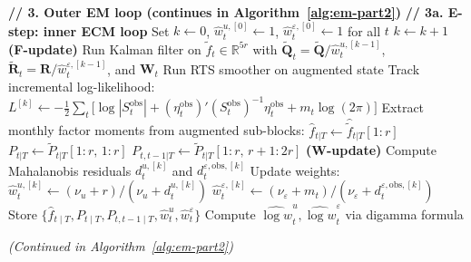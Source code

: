 \documentclass[11pt, a4paper, oneside]{article}
\begin{document}
\begin{algorithm}[H]
\begin{algorithmic}[1]
\vspace{0.3em}
\State \textbf{// 3. Outer EM loop (continues in Algorithm~\ref{alg:em-part2})}
    \vspace{0.2em}
    \State \textbf{// 3a. E-step: inner ECM loop}
    \State Set $k \gets 0$, $\hat{w}^{u,[0]}_t \gets 1$, $\hat{w}^{\varepsilon,[0]}_t \gets 1$ for all $t$
    \Repeat
        \State $k \gets k + 1$
        \State \textbf{(F-update)} Run Kalman filter on $\tilde{f}_t \in \mathbb{R}^{5r}$ with
        \Statex \quad $\tilde{\mathbf{Q}}_t = \tilde{\mathbf{Q}}/\hat{w}^{u,[k-1]}_t$, $\tilde{\mathbf{R}}_t = \mathbf{R}/\hat{w}^{\varepsilon,[k-1]}_t$, and $\mathbf{W}_t$
        \State Run RTS smoother on augmented state
        \State Track incremental log-likelihood:
        \Statex \quad $L^{[k]} \gets -\tfrac{1}{2}\sum_t \big[\log|S^{\mathrm{obs}}_t| + (\eta^{\mathrm{obs}}_t)' (S^{\mathrm{obs}}_t)^{-1} \eta^{\mathrm{obs}}_t + m_t \log(2\pi)\big]$
        \State Extract monthly factor moments from augmented sub-blocks:
        \Statex \quad $\hat{f}_{t|T} \gets \hat{\tilde{f}}_{t|T}[1{:}r]$
        \Statex \quad $P_{t|T} \gets \tilde{P}_{t|T}[1{:}r,\, 1{:}r]$
        \Statex \quad $P_{t, t-1|T} \gets \tilde{P}_{t|T}[1{:}r,\, r{+}1{:}2r]$
        \State \textbf{(W-update)} Compute Mahalanobis residuals $d^{u,[k]}_t$ and $d^{\varepsilon,\mathrm{obs},[k]}_t$
        \State Update weights:
        \Statex \quad $\hat{w}^{u,[k]}_t \gets (\nu_u + r) / (\nu_u + d^{u,[k]}_t)$
        \Statex \quad $\hat{w}^{\varepsilon,[k]}_t \gets (\nu_\varepsilon + m_t) / (\nu_\varepsilon + d^{\varepsilon,\mathrm{obs},[k]}_t)$
    \State Store $\{\hat{f}_{t \mid T}, P_{t \mid T}, P_{t, t-1 \mid T}, \hat{w}^u_t, \hat{w}^\varepsilon_t\}$
    \State Compute $\widehat{\log w}^u_t, \widehat{\log w}^\varepsilon_t$ via digamma formula

    \Statex \hfill \emph{(Continued in Algorithm~\ref{alg:em-part2})}
\EndFor
\end{algorithmic}
\end{algorithm}
\end{document}
